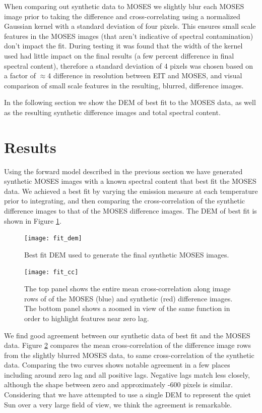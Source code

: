 		When comparing out synthetic data to MOSES we slightly blur each MOSES image prior to taking the difference and cross-correlating using a normalized Gaussian kernel with a standard deviation of four pixels.
		This ensures small scale features in the MOSES images (that aren't indicative of spectral contamination) don't impact the fit.
		During testing it was found that the width of the kernel used had little impact on the final results (a few percent difference in final spectral content), therefore a standard deviation of 4 pixels was chosen based on a factor of $\approx$4 difference in resolution between EIT and MOSES, and visual comparison of small scale features in the resulting, blurred, difference images.
		
		In the following section we show the DEM of best fit to the MOSES data, as well as the resulting synthetic difference images and total spectral content.
	

\section{Results}\label{sec:results}
	Using the forward model described in the previous section we have generated synthetic MOSES images with a known spectral content that best fit the MOSES data.
	We achieved a best fit by varying the emission measure at each temperature prior to integrating, and then comparing the cross-correlation of the synthetic difference images to that of the MOSES difference images.
	The DEM of best fit is shown in Figure \ref{fig:dem}.
	
	\begin{figure}
		\centering
		\texttt{[image: fit\_dem]}
		\caption{Best fit DEM used to generate the final synthetic MOSES images.}
		\label{fig:dem}
	\end{figure}

	\begin{figure}
		\centering
		\texttt{[image: fit\_cc]}
		\caption{The top panel shows the entire mean cross-correlation along image rows of of the MOSES (blue) and synthetic (red) difference images.  The bottom panel shows a zoomed in view of the same function in order to highlight features near zero lag.}
		\label{fig:fit_cc}
	\end{figure}
	
	We find good agreement between our synthetic data of best fit and the MOSES data.
	Figure \ref{fig:fit_cc} compares the mean cross-correlation of the difference image rows from the slightly blurred MOSES data, to same cross-correlation of the synthetic data.
	Comparing the two curves shows notable agreement in a few places including around zero lag and all positive lags.
	Negative lags match less closely, although the shape between zero and approximately -600 pixels is similar. 
	Considering that we have attempted to use a single DEM to represent the quiet Sun over a very large field of view, we think the agreement is remarkable.

